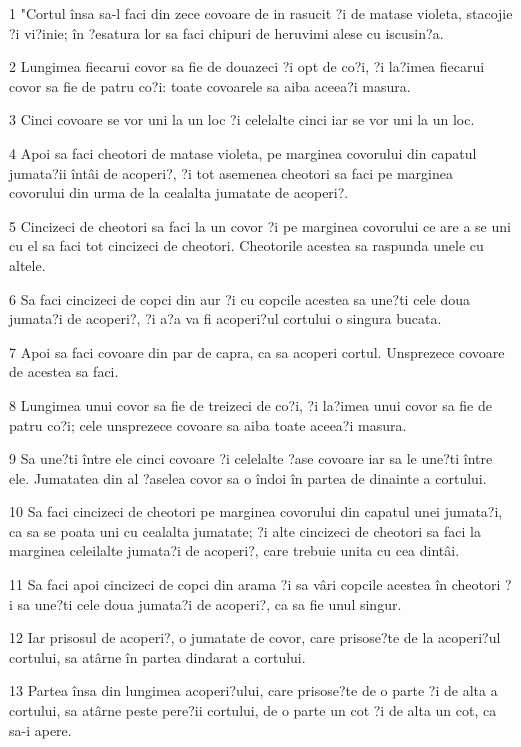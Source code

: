 \par 1 "Cortul însa sa-l faci din zece covoare de in rasucit ?i de matase violeta, stacojie ?i vi?inie; în ?esatura lor sa faci chipuri de heruvimi alese cu iscusin?a.
\par 2 Lungimea fiecarui covor sa fie de douazeci ?i opt de co?i, ?i la?imea fiecarui covor sa fie de patru co?i: toate covoarele sa aiba aceea?i masura.
\par 3 Cinci covoare se vor uni la un loc ?i celelalte cinci iar se vor uni la un loc.
\par 4 Apoi sa faci cheotori de matase violeta, pe marginea covorului din capatul jumata?ii întâi de acoperi?, ?i tot asemenea cheotori sa faci pe marginea covorului din urma de la cealalta jumatate de acoperi?.
\par 5 Cincizeci de cheotori sa faci la un covor ?i pe marginea covorului ce are a se uni cu el sa faci tot cincizeci de cheotori. Cheotorile acestea sa raspunda unele cu altele.
\par 6 Sa faci cincizeci de copci din aur ?i cu copcile acestea sa une?ti cele doua jumata?i de acoperi?, ?i a?a va fi acoperi?ul cortului o singura bucata.
\par 7 Apoi sa faci covoare din par de capra, ca sa acoperi cortul. Unsprezece covoare de acestea sa faci.
\par 8 Lungimea unui covor sa fie de treizeci de co?i, ?i la?imea unui covor sa fie de patru co?i; cele unsprezece covoare sa aiba toate aceea?i masura.
\par 9 Sa une?ti între ele cinci covoare ?i celelalte ?ase covoare iar sa le une?ti între ele. Jumatatea din al ?aselea covor sa o îndoi în partea de dinainte a cortului.
\par 10 Sa faci cincizeci de cheotori pe marginea covorului din capatul unei jumata?i, ca sa se poata uni cu cealalta jumatate; ?i alte cincizeci de cheotori sa faci la marginea celeilalte jumata?i de acoperi?, care trebuie unita cu cea dintâi.
\par 11 Sa faci apoi cincizeci de copci din arama ?i sa vâri copcile acestea în cheotori ?i sa une?ti cele doua jumata?i de acoperi?, ca sa fie unul singur.
\par 12 Iar prisosul de acoperi?, o jumatate de covor, care prisose?te de la acoperi?ul cortului, sa atârne în partea dindarat a cortului.
\par 13 Partea însa din lungimea acoperi?ului, care prisose?te de o parte ?i de alta a cortului, sa atârne peste pere?ii cortului, de o parte un cot ?i de alta un cot, ca sa-i apere.
